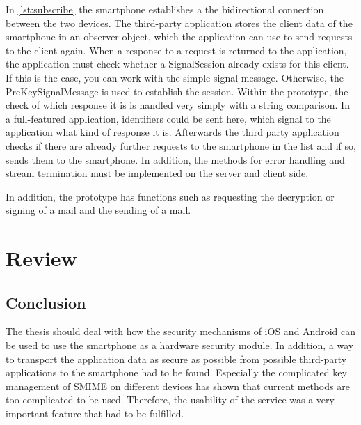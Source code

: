 \documentclass[12pt,oneside,a4paper,parskip]{scrbook}
\begin{document}
\newpage
In \ref{lst:subscribe} the smartphone establishes a the bidirectional connection between the two devices. The third-party application stores the client data of the smartphone in an observer object, which the application can use to send requests to the client again. When a response to a request is returned to the application, the application must check whether a SignalSession already exists for this client. If this is the case, you can work with the simple signal message. Otherwise, the PreKeySignalMessage is used to establish the session. Within the prototype, the check of which response it is is handled very simply with a string comparison. In a full-featured application, identifiers could be sent here, which signal to the application what kind of response it is. Afterwards the third party application checks if there are already further requests to the smartphone in the list and if so, sends them to the smartphone. In addition, the methods for error handling and stream termination must be implemented on the server and client side.

In addition, the prototype has functions such as requesting the decryption or signing of a mail and the sending of a mail.






\chapter{Review}
\section{Conclusion}
The thesis should deal with how the security mechanisms of iOS and Android can be used to use the smartphone as a hardware security module. In addition, a way to transport the application data as secure as possible from possible third-party applications to the smartphone had to be found. Especially the complicated key management of SMIME on different devices has shown that current methods are too complicated to be used. Therefore, the usability of the service was a very important feature that had to be fulfilled.
\end{document}

